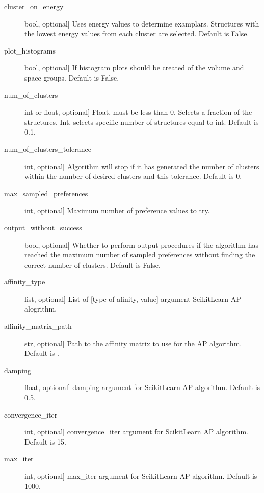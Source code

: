 \documentclass[letterpaper,10pt,english]{sphinxmanual}
\begin{document}
\begin{fulllineitems}
\begin{fulllineitems}
\begin{description}
\item[{cluster\_on\_energy}] \leavevmode{[}bool, optional{]}
Uses energy values to determine examplars. Structures with the
lowest energy values from each cluster are selected.
Default is False.

\item[{plot\_histograms}] \leavevmode{[}bool, optional{]}
If histogram plots should be created of the volume and space
groups. Default is False.

\item[{num\_of\_clusters}] \leavevmode{[}int or float, optional{]}
Float, must be less than 0. Selects a fraction of the structures.
Int, selects specific number of structures equal to int.
Default is 0.1.

\item[{num\_of\_clusters\_tolerance}] \leavevmode{[}int, optional{]}
Algorithm will stop if it has generated the number of clusters
within the number of desired clusters and this tolerance.
Default is 0.

\item[{max\_sampled\_preferences}] \leavevmode{[}int, optional{]}
Maximum number of preference values to try.

\item[{output\_without\_success}] \leavevmode{[}bool, optional{]}
Whether to perform output procedures if the algorithm has reached
the maximum number of sampled preferences without finding the
correct number of clusters. Default is False.

\item[{affinity\_type}] \leavevmode{[}list, optional{]}
List of {[}type of afinity, value{]} argument Scikit\sphinxhyphen{}Learn AP alogrithm.

\item[{affinity\_matrix\_path}] \leavevmode{[}str, optional{]}
Path to the affinity matrix to use for the AP algorithm.
Default is .

\item[{damping}] \leavevmode{[}float, optional{]}
damping argument for Scikit\sphinxhyphen{}Learn AP algorithm. Default is 0.5.

\item[{convergence\_iter}] \leavevmode{[}int, optional{]}
convergence\_iter argument for Scikit\sphinxhyphen{}Learn AP algorithm.
Default is 15.

\item[{max\_iter}] \leavevmode{[}int, optional{]}
max\_iter argument for Scikit\sphinxhyphen{}Learn AP algorithm. Default is 1000.


\end{description}
\end{fulllineitems}
\end{fulllineitems}
\end{document}
